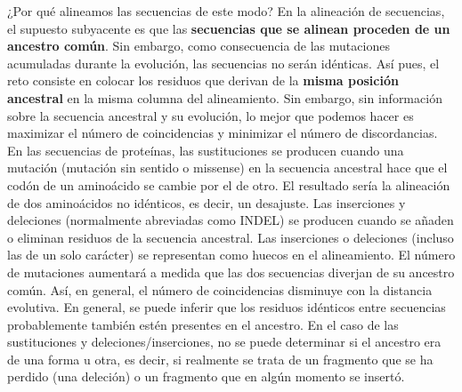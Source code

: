 ¿Por qué alineamos las secuencias de este modo? En la alineación de secuencias, el supuesto subyacente es que las \textbf{secuencias que se alinean proceden de un ancestro común}. Sin embargo, como consecuencia de las mutaciones acumuladas durante la evolución, las secuencias no serán idénticas. Así pues, el reto consiste en colocar los residuos que derivan de la \textbf{misma posición ancestral} en la misma columna del alineamiento. Sin embargo, sin información sobre la secuencia ancestral y su evolución, lo mejor que podemos hacer es maximizar el número de coincidencias y minimizar el número de discordancias. En las secuencias de proteínas, las sustituciones se producen cuando una mutación (mutación sin sentido o missense) en la secuencia ancestral hace que el codón de un aminoácido se cambie por el de otro. El resultado sería la alineación de dos aminoácidos no idénticos, es decir, un desajuste. Las inserciones y deleciones (normalmente abreviadas como INDEL) se producen cuando se añaden o eliminan residuos de la secuencia ancestral. Las inserciones o deleciones (incluso las de un solo carácter) se representan como huecos en el alineamiento. El número de mutaciones aumentará a medida que las dos secuencias diverjan de su ancestro común. Así, en general, el número de coincidencias disminuye con la distancia evolutiva. En general, se puede inferir que los residuos idénticos entre secuencias probablemente también estén presentes en el ancestro. En el caso de las sustituciones y deleciones/inserciones, no se puede determinar si el ancestro era de una forma u otra, es decir, si realmente se trata de un fragmento que se ha perdido (una deleción) o un fragmento que en algún momento se insertó. 

